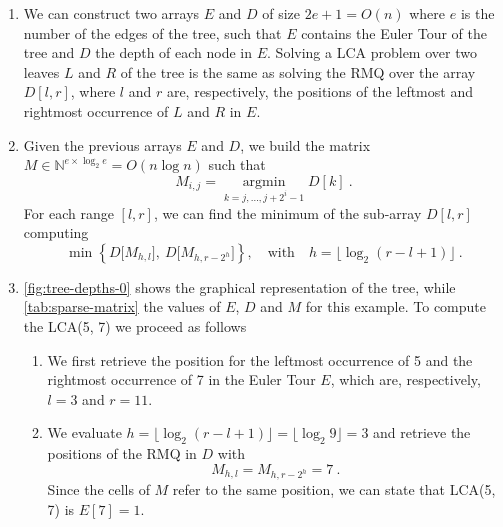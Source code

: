 \solution
%
\begin{enumerate}

  \item We can construct two arrays $E$ and $D$ of size $2e + 1 = O(n)$ where
  $e$ is the number of the edges of the tree, such that  $E$ contains the Euler
  Tour of the tree and $D$ the depth of each node in $E$. Solving a LCA problem
  over two leaves $L$ and $R$ of the tree is the same as solving the RMQ over
  the array $D[l, r]$, where $l$ and $r$ are, respectively, the positions of the
  leftmost and rightmost occurrence of $L$ and $R$ in $E$.

  \item Given the previous arrays $E$ and $D$, we build the matrix $M \in
  \mathbb{N}^{e \times \log_2 e} = O(n\log n)$ such that $$M_{i, j} =
  \operatorname*{argmin}_{k = j, \dots, j + 2^i - 1} D[k]\ .$$ For each range
  $[l, r]$, we can find the minimum of the sub-array $D[l, r]$ computing $$\min
  \left\{ D\big[M_{h, l}\big],\ D\big[M_{h, r - 2^h}\big] \right\}, \quad
  \text{with}\quad h = \lfloor \log_2 (r - l + 1)\rfloor\ .$$

  \item \autoref{fig:tree-depths-0} shows the graphical representation of the
  tree, while \autoref{tab:sparse-matrix} the values of $E$, $D$ and $M$ for
  this example. To compute the LCA(5, 7) we proceed as follows
  \begin{enumerate}

    \item We first retrieve the position for the leftmost occurrence of 5 and
    the rightmost occurrence of 7 in the Euler Tour $E$, which are,
    respectively, $l = 3$ and $r = 11$.

    \item We evaluate $h = \lfloor\log_2 (r - l + 1) \rfloor = \lfloor\log_2 9
    \rfloor = 3$ and retrieve the positions of the RMQ in $D$ with $$M_{h, l} =
    M_{h, r - 2^h} = 7\ .$$ Since the cells of $M$ refer to the same position,
    we can state that LCA(5, 7) is $E[7] = 1$.

  \end{enumerate}
  \begin{figure}[t]
    \centering


\end{figure}
\end{enumerate}
